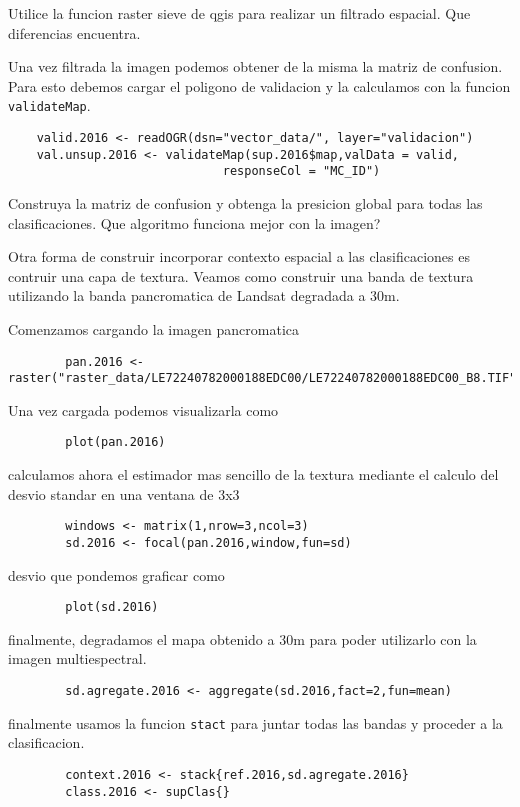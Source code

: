 \documentclass[a4paper]{article}
\begin{document}
\begin{act}
    Utilice la funcion raster sieve de qgis para realizar un filtrado espacial.
    Que diferencias encuentra.
\end{act}

Una vez filtrada la imagen podemos obtener de la misma la matriz de confusion.
Para esto debemos cargar el poligono de validacion y la calculamos con la
funcion \texttt{validateMap}.

\begin{lstlisting}
    valid.2016 <- readOGR(dsn="vector_data/", layer="validacion")
    val.unsup.2016 <- validateMap(sup.2016$map,valData = valid, 
                              responseCol = "MC_ID")
\end{lstlisting}

\begin{act}
    Construya la matriz de confusion y obtenga la presicion global para todas
    las clasificaciones. Que algoritmo funciona mejor con la imagen?
\end{act}

Otra forma de construir incorporar contexto espacial a las clasificaciones es
contruir una capa de textura. Veamos como construir una banda de textura
utilizando la banda pancromatica de Landsat degradada a 30m.

\begin{exa}
    Comenzamos cargando la imagen pancromatica
    \begin{lstlisting}
        pan.2016 <- raster("raster_data/LE72240782000188EDC00/LE72240782000188EDC00_B8.TIF")
    \end{lstlisting}
    Una vez cargada podemos visualizarla como 
    \begin{lstlisting}
        plot(pan.2016)
    \end{lstlisting}
    calculamos ahora el estimador mas sencillo de la textura mediante el calculo
    del desvio standar en una ventana de 3x3
    \begin{lstlisting}
        windows <- matrix(1,nrow=3,ncol=3)
        sd.2016 <- focal(pan.2016,window,fun=sd)
    \end{lstlisting}
    desvio que pondemos graficar como
    \begin{lstlisting}
        plot(sd.2016)
    \end{lstlisting}
    finalmente, degradamos el mapa obtenido a 30m para poder utilizarlo con la
    imagen multiespectral.
    \begin{lstlisting}
        sd.agregate.2016 <- aggregate(sd.2016,fact=2,fun=mean)
    \end{lstlisting}
    finalmente usamos la funcion \texttt{stact} para juntar todas las bandas y
    proceder a la clasificacion.
    \begin{lstlisting}
        context.2016 <- stack{ref.2016,sd.agregate.2016}
        class.2016 <- supClas{}
    \end{lstlisting}
\end{exa}
\end{document}

